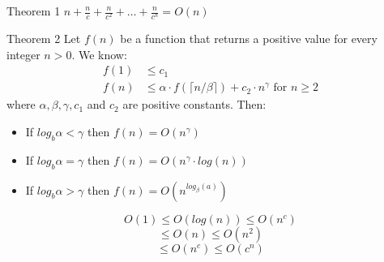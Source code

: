 \documentclass{lecture}
\begin{document}
\begin{landscape}
\begin{multicols}{2}
    \begin{note}{Theorem 1}
        $n+\frac{n}{c}+\frac{n}{c^2}+\ldots+\frac{n}{c^h}=O(n)$
    \end{note}
    \vfill
    \begin{note}{Theorem 2}
        Let $f(n)$ be a function that returns a positive value for every integer $n>0$. We know:
        \begin{align*}
            f(1) & \leqslant c_1\\
            f(n) & \leqslant \alpha \cdot f(\lceil n / \beta \rceil) + c_2 \cdot n^{\gamma} \text{ for } n \geqslant 2
        \end{align*}
        where $\alpha, \beta, \gamma, c_1$ and $c_2$ are positive constants. Then:
        \begin{itemize}
            \item If $log_{b} \alpha < \gamma$ then $f(n) = O(n^\gamma)$
            \item If $log_{b} \alpha = \gamma$ then $f(n) = O(n^\gamma \cdot log(n))$
            \item If $log_{b} \alpha > \gamma$ then $f(n) = O(n^{log_\beta(a)})$
        \end{itemize}
    \end{note}
    \vfill

    \begin{note}{}
        $$O(1) \leqslant O(log(n)) \leqslant O(n^c)$$ 
        $$\leqslant O(n) \leqslant O(n^2)$$ 
        $$\leqslant O(n^c) \leqslant O(c^n)$$
    \end{note}
    \vfill


\end{multicols}
\end{landscape}
\end{document}

